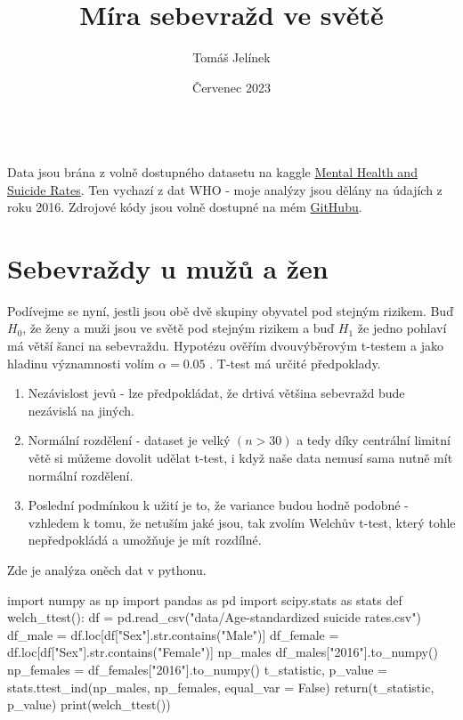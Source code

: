 \documentclass[12pt]{article}
\title{Míra sebevražd ve světě}
\author{Tomáš Jelínek}
\date{Červenec 2023}
\begin{document}
\maketitle
{}\\

Data jsou brána z volně dostupného datasetu na kaggle \href{https://www.kaggle.com/datasets/twinkle0705/mental-health-and-suicide-rates?select=Facilities.csv}{Mental Health and Suicide Rates}. Ten vychazí z dat WHO - moje analýzy jsou dělány na údajích z roku 2016. Zdrojové kódy jsou volně dostupné na mém \href{https://github.com/Desperadus/PaST-Zapoctak}{GitHubu}.

\section{Sebevraždy u mužů a žen}
Podívejme se nyní, jestli jsou obě dvě skupiny obyvatel pod stejným rizikem. Buď $H_0$, že ženy a muži jsou ve světě pod stejným rizikem a buď $H_1$ že jedno pohlaví má větší šanci na sebevraždu. Hypotézu ověřím dvouvýběrovým t-testem a jako hladinu významnosti volím $\alpha = 0.05$ . T-test má určité předpoklady.
\begin{enumerate}
\item Nezávislost jevů - lze předpokládat, že drtivá většina sebevražd bude nezávislá na jiných.
\item Normální rozdělení - dataset je velký $(n > 30)$ a tedy díky centrální limitní větě si můžeme dovolit udělat t-test, i když naše data nemusí sama nutně mít normální rozdělení.
\item Poslední podmínkou k užití je to, že variance budou hodně podobné - vzhledem k tomu, že netuším jaké jsou, tak zvolím Welchův t-test, který tohle nepředpokládá a umožňuje je mít rozdílné.
\end{enumerate}

\newpage
Zde je analýza oněch dat v pythonu.
\begin{python}
import numpy as np
import pandas as pd
import scipy.stats as stats
def welch_ttest():
		df = pd.read_csv("data/Age-standardized suicide rates.csv")
    df_male = df.loc[df["Sex"].str.contains("Male")]
    df_female = df.loc[df["Sex"].str.contains("Female")]
    np_males df_males["2016"].to_numpy()
    np_females = df_females["2016"].to_numpy()
    t_statistic, p_value = stats.ttest_ind(np_males, np_females, equal_var = False)
    return(t_statistic, p_value)
print(welch_ttest())
\end{python}
\end{document}
